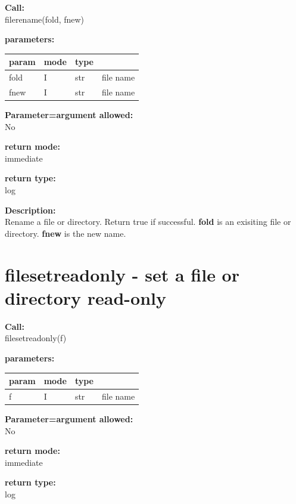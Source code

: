         {\bf Call:} \\
        filerename(fold, fnew)
        
        {\bf parameters:} \\
        \begin{tabular}{| l | l | l | l |}
        \hline
        param  & mode & type & \\
        \hline \hline
        fold & I & str & file name \\ \hline
        fnew & I & str & file name \\ \hline
        \end{tabular}
        
        {\bf Parameter=argument allowed:} \\
        No
        
        {\bf return mode:} \\
        immediate

        {\bf return type:} \\
        log
        
        {\bf Description:} \\
        Rename a file or directory. Return true if successful.
        {\bf fold} is an exisiting file or directory. {\bf fnew}
        is the new name.
 


    \section{filesetreadonly - set a file or directory read-only}\label{sec:iffilesetreadonly}
        
        {\bf Call:} \\
        filesetreadonly(f)
        
        {\bf parameters:} \\
        \begin{tabular}{| l | l | l | l |}
        \hline
        param  & mode & type & \\
        \hline \hline
        f & I & str & file name \\ \hline
        \end{tabular}
        
        {\bf Parameter=argument allowed:} \\
        No
        
        {\bf return mode:} \\
        immediate

        {\bf return type:} \\
        log
        
